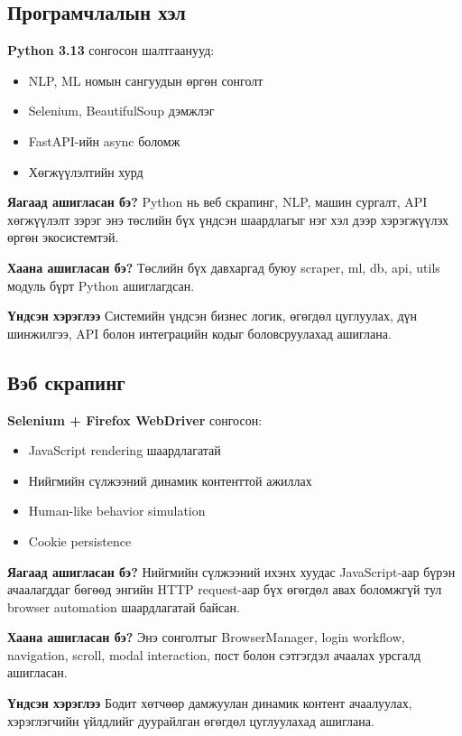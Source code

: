 \documentclass[12pt,a4paper]{report}
\begin{document}
\subsection{Програмчлалын хэл}

\textbf{Python 3.13} сонгосон шалтгаанууд:
\begin{itemize}
    \item NLP, ML номын сангуудын өргөн сонголт
    \item Selenium, BeautifulSoup дэмжлэг
    \item FastAPI-ийн async боломж
    \item Хөгжүүлэлтийн хурд
\end{itemize}

\textbf{Яагаад ашигласан бэ?} Python нь веб скрапинг, NLP, машин сургалт, API хөгжүүлэлт зэрэг энэ төслийн бүх үндсэн шаардлагыг нэг хэл дээр хэрэгжүүлэх өргөн экосистемтэй.

\textbf{Хаана ашигласан бэ?} Төслийн бүх давхаргад буюу scraper, ml, db, api, utils модуль бүрт Python ашиглагдсан.

\textbf{Үндсэн хэрэглээ} Системийн үндсэн бизнес логик, өгөгдөл цуглуулах, дүн шинжилгээ, API болон интеграцийн кодыг боловсруулахад ашиглана.

\subsection{Вэб скрапинг}

\textbf{Selenium + Firefox WebDriver} сонгосон:
\begin{itemize}
    \item JavaScript rendering шаардлагатай
    \item Нийгмийн сүлжээний динамик контенттой ажиллах
    \item Human-like behavior simulation
    \item Cookie persistence
\end{itemize}

\textbf{Яагаад ашигласан бэ?} Нийгмийн сүлжээний ихэнх хуудас JavaScript-аар бүрэн ачаалагддаг бөгөөд энгийн HTTP request-аар бүх өгөгдөл авах боломжгүй тул browser automation шаардлагатай байсан.

\textbf{Хаана ашигласан бэ?} Энэ сонголтыг BrowserManager, login workflow, navigation, scroll, modal interaction, пост болон сэтгэгдэл ачаалах урсгалд ашигласан.

\textbf{Үндсэн хэрэглээ} Бодит хөтчөөр дамжуулан динамик контент ачаалуулах, хэрэглэгчийн үйлдлийг дуурайлган өгөгдөл цуглуулахад ашиглана.
\end{document}
